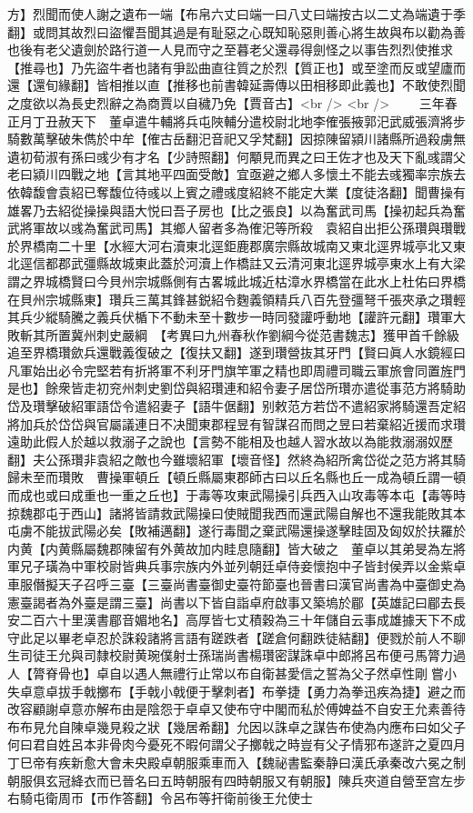 方】烈聞而使人謝之遺布一端【布帛六丈曰端一曰八丈曰端按古以二丈為端遺于季翻】或問其故烈曰盜懼吾聞其過是有耻惡之心既知恥惡則善心將生故與布以勸為善也後有老父遺劍於路行道一人見而守之至暮老父還尋得劍怪之以事告烈烈使推求【推尋也】乃先盜牛者也諸有爭訟曲直往質之於烈【質正也】或至塗而反或望廬而還【還旬緣翻】皆相推以直【推移也前書韓延壽傳以田相移即此義也】不敢使烈聞之度欲以為長史烈辭之為商賈以自穢乃免【賈音古】<br />
<br />
　　三年春正月丁丑赦天下　董卓遣牛輔將兵屯陜輔分遣校尉北地李傕張掖郭汜武威張濟將步騎數萬擊破朱儁於中牟【傕古岳翻汜音祀又孚梵翻】因掠陳留潁川諸縣所過殺虜無遺初荀淑有孫曰彧少有才名【少詩照翻】何顒見而異之曰王佐才也及天下亂彧謂父老曰潁川四戰之地【言其地平四面受敵】宜亟避之鄉人多懷土不能去彧獨率宗族去依韓馥會袁紹已奪馥位待彧以上賓之禮彧度紹終不能定大業【度徒洛翻】聞曹操有雄畧乃去紹從操操與語大悦曰吾子房也【比之張良】以為奮武司馬【操初起兵為奮武將軍故以彧為奮武司馬】其鄉人留者多為傕汜等所殺　袁紹自出拒公孫瓚與瓚戰於界橋南二十里【水經大河右瀆東北逕鉅鹿郡廣宗縣故城南又東北逕界城亭北又東北逕信都郡武彊縣故城東此蓋於河瀆上作橋註又云清河東北逕界城亭東水上有大梁謂之界城橋賢曰今貝州宗城縣側有古畧城此城近枯漳水界橋當在此水上杜佑曰界橋在貝州宗城縣東】瓚兵三萬其鋒甚鋭紹令麴義領精兵八百先登彊弩千張夾承之瓚輕其兵少縱騎騰之義兵伏楯下不動未至十數步一時同發讙呼動地【讙許元翻】瓚軍大敗斬其所置冀州刺史嚴綱　【考異曰九州春秋作劉綱今從范書魏志】獲甲首千餘級追至界橋瓚歛兵還戰義復破之【復扶又翻】遂到瓚營抜其牙門【賢曰眞人水鏡經曰凡軍始出必令完堅若有折將軍不利牙門旗竿軍之精也即周禮司職云軍旅會同置旌門是也】餘衆皆走初兖州刺史劉岱與紹瓚連和紹令妻子居岱所瓚亦遣從事范方將騎助岱及瓚擊破紹軍語岱令遣紹妻子【語牛倨翻】别敕范方若岱不遣紹家將騎還吾定紹將加兵於岱岱與官屬議連日不决聞東郡程昱有智謀召而問之昱曰若棄紹近援而求瓚遠助此假人於越以救溺子之說也【言勢不能相及也越人習水故以為能救溺溺奴歷翻】夫公孫瓚非袁紹之敵也今雖壞紹軍【壞音怪】然終為紹所禽岱從之范方將其騎歸未至而瓚敗　曹操軍頓丘【頓丘縣屬東郡師古曰以丘名縣也丘一成為頓丘謂一頓而成也或曰成重也一重之丘也】于毒等攻東武陽操引兵西入山攻毒等本屯【毒等時掠魏郡屯于西山】諸將皆請救武陽操曰使賊聞我西而還武陽自解也不還我能敗其本屯虜不能拔武陽必矣【敗補邁翻】遂行毒聞之棄武陽還操遂擊眭固及匈奴於扶羅於内黄【内黄縣屬魏郡陳留有外黄故加内眭息隨翻】皆大破之　董卓以其弟旻為左將軍兄子璜為中軍校尉皆典兵事宗族内外並列朝廷卓侍妾懷抱中子皆封侯弄以金紫卓車服僭擬天子召呼三臺【三臺尚書臺御史臺符節臺也晉書曰漢官尚書為中臺御史為憲臺謁者為外臺是謂三臺】尚書以下皆自詣卓府啟事又築塢於郿【英雄記曰郿去長安二百六十里漢書郿音媚地名】高厚皆七丈積穀為三十年儲自云事成雄據天下不成守此足以畢老卓忍於誅殺諸將言語有蹉跌者【蹉倉何翻跌徒結翻】便戮於前人不聊生司徒王允與司隸校尉黄琬僕射士孫瑞尚書楊瓚密謀誅卓中郎將呂布便弓馬膂力過人【膂脊骨也】卓自以遇人無禮行止常以布自衛甚愛信之誓為父子然卓性剛嘗小失卓意卓拔手戟擲布【手戟小戟便于擊刺者】布拳捷【勇力為拳迅疾為捷】避之而改容顧謝卓意亦解布由是陰怨于卓卓又使布守中閣而私於傅婢益不自安王允素善待布布見允自陳卓幾見殺之狀【幾居希翻】允因以誅卓之謀告布使為内應布曰如父子何曰君自姓呂本非骨肉今憂死不暇何謂父子擲戟之時豈有父子情邪布遂許之夏四月丁巳帝有疾新愈大會未央殿卓朝服乘車而入【魏祕書監秦静曰漢氏承秦改六冕之制朝服俱玄冠絳衣而已晉名曰五時朝服有四時朝服又有朝服】陳兵夾道自營至宫左步右騎屯衛周帀【帀作答翻】令呂布等扞衛前後王允使士